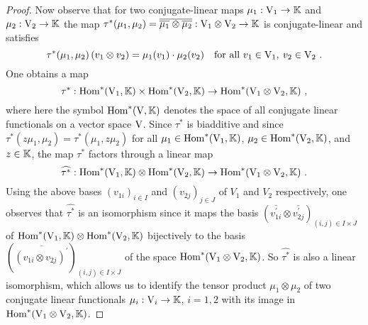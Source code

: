 \begin{proof}
  Now observe that for two conjugate-linear maps $\mu_1 :\mathrm{V}_1 \to \mathbb{K}$
  and $\mu_2 :\mathrm{V}_2 \to \mathbb{K}$ the map 
  $ \tau^* (\mu_1,\mu_2)  = \overline{\overline{\mu_1}\otimes \overline{\mu_2}} : 
     \mathrm{V}_1 \otimes \mathrm{V}_2 \to \mathbb{K}$
  is conjugate-linear and satisfies 
  \begin{equation}
  \label{eq:defining-relation-tensor-product-conjugate-linear-maps}
     \tau^* (\mu_1,\mu_2) \, (v_1\otimes v_2) = \mu_1(v_1) \cdot \mu_2(v_2) \quad
     \text{for all } v_1\in\vectorspV_1 ,\: v_2 \in\vectorspV_2 \ . 
  \end{equation}
  One obtains a map 
  \[
    \tau^*: \operatorname{Hom}\nolimits^* (\mathrm{V}_1,\mathbb{K}) \times \operatorname{Hom}\nolimits^* (\mathrm{V}_2,\mathbb{K}) 
    \to \operatorname{Hom}\nolimits^* (\mathrm{V}_1 \otimes \mathrm{V}_2 ,\mathbb{K}) \ , 
  \] 
  where here the symbol $\operatorname{Hom}\nolimits^* (\mathrm{V},\mathbb{K})$ denotes the space  of all conjugate linear
  functionals on a vector space $\mathrm{V}$. Since $\tau^*$ is biadditive and 
  since $\tau^* (z\mu_1,\mu_2) = \tau^* (\mu_1,z\mu_2)$ for all $\mu_1\in \operatorname{Hom}\nolimits^*(\mathrm{V}_1 ,\mathbb{K})$,
  $\mu_2\in \operatorname{Hom}\nolimits^*(\mathrm{V}_2 ,\mathbb{K})$, and $z\in \mathbb{K}$, the map $\tau^*$ factors through a linear map 
   \[
    \widehat{\tau^*} :\operatorname{Hom}\nolimits^* (\mathrm{V}_1 ,\mathbb{K}) \otimes \operatorname{Hom}\nolimits^* (\mathrm{V}_2,\mathbb{K}) \to
    \operatorname{Hom}\nolimits^* (\mathrm{V}_1 \otimes \mathrm{V}_2,\mathbb{K})  \ .
  \]
  Using the above bases $(v_{1i})_{i\in I} $ and $(v_{2j})_{j\in J} $ of $V_1$ and $V_2$ respectively,
  one observes that $\widehat{\tau^*}$ is an isomorphism since it maps the basis
  $\left( \overline{v^\prime_{1i}} \otimes \overline{v^\prime_{2j}}\right)_{(i,j)\in I \times J}$ of
  $\operatorname{Hom}\nolimits^* (\mathrm{V}_1 ,\mathbb{K}) \otimes \operatorname{Hom}\nolimits^* (\mathrm{V}_2,\mathbb{K})$
  bijectively to the basis $\left( \overline{(v_{1i} \otimes v_{2j})^\prime} \right)_{(i,j)\in I \times J}$
  of the space $\operatorname{Hom}\nolimits^* (\mathrm{V}_1 \otimes \mathrm{V}_2,\mathbb{K})$.  So $\widehat{\tau^*}$ is also
  a linear isomorphism, which allows us to identify the tensor product $\mu_1 \otimes \mu_2$
  of two conjugate linear functionals  $\mu_i: \mathrm{V}_i\to\mathbb{K}$, $i=1,2$ with its image in
  $\operatorname{Hom}\nolimits^* (\mathrm{V}_1 \otimes \mathrm{V}_2,\mathbb{K})$.
  


\end{proof}
